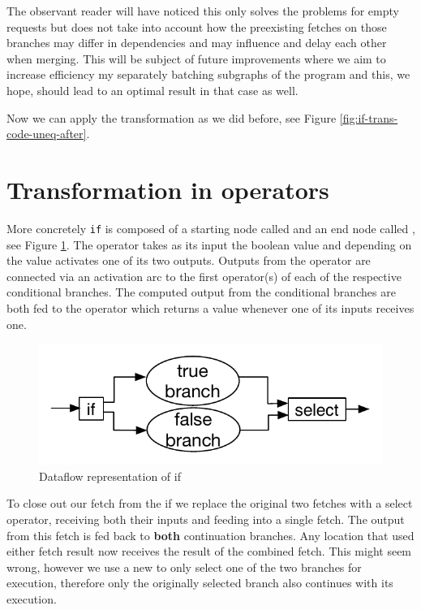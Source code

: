 The observant reader will have noticed this only solves the problems for empty requests but does not take into account how the preexisting fetches on those branches may differ in dependencies and may influence and delay each other when merging.
This will be subject of future improvements where we aim to increase efficiency my separately batching subgraphs of the program and this, we hope, should lead to an optimal result in that case as well.

Now we can apply the transformation as we did before, see Figure \ref{fig:if-trans-code-uneq-after}.

\section{Transformation in operators}

More concretely \texttt{if} is composed of a starting node called \opite{} and an end node called \opselect{}, see Figure \ref{fig:basic-if}.
The \opite{} operator takes as its input the boolean value and depending on the value activates one of its two outputs.
Outputs from the \opite{} operator are connected via an activation arc to the first operator(s) of each of the respective conditional branches.
The computed output from the conditional branches are both fed to the \opselect{} operator which returns a value whenever one of its inputs receives one.

\begin{figure}
	\includegraphics[width=\textwidth]{Figures/basic-if}
	\caption{Dataflow representation of if}
	\label{fig:basic-if}
\end{figure}

To close out our fetch from the if we replace the original two fetches with a select operator, receiving both their inputs and feeding into a single fetch.
The output from this fetch is fed back to \textbf{both} continuation branches.
Any location that used either fetch result now receives the result of the combined fetch.
This might seem wrong, however we use a new \opite{} to only select one of the two branches for execution, therefore only the originally selected branch also continues with its execution.


